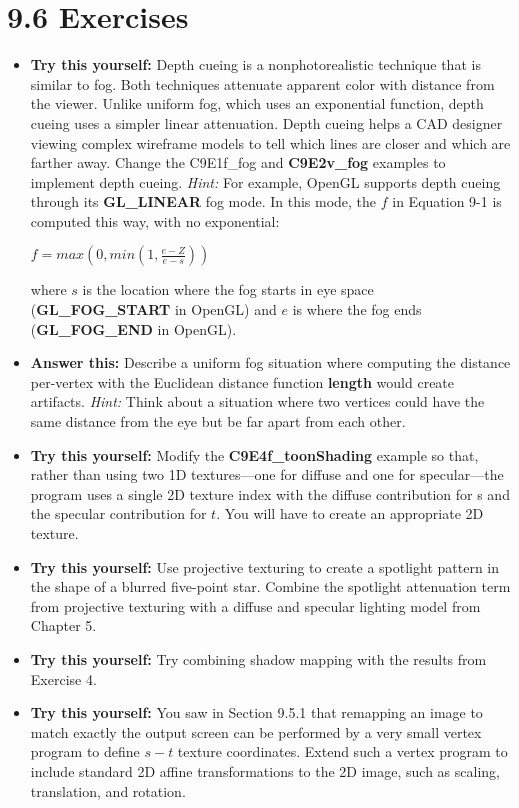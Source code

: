 \documentclass[../main.tex]{subfiles}
\begin{document}
\section{9.6 Exercises}
\begin{itemize}
\item \textbf{Try this yourself:} Depth cueing is a nonphotorealistic technique that is similar to fog. Both techniques attenuate apparent color with distance from the viewer. Unlike uniform fog, which uses an exponential function, depth cueing uses a simpler linear attenuation. Depth cueing helps a CAD designer viewing complex wireframe models to tell which lines are closer and which are farther away. Change the C9E1f_fog\textbf{ }and \textbf{C9E2v_fog} examples to implement depth cueing. \textit{Hint:} For example, OpenGL supports depth cueing through its \textbf{GL_LINEAR} fog mode. In this mode, the $f$ in Equation 9-1 is computed this way, with no exponential:

\FloatBarrier
$
f=max\left( 0,min\left( 1,\frac{e-Z}{e-s}\right) \right)
$
\FloatBarrier

where $s$ is the location where the fog starts in eye space (\textbf{GL_FOG_START} in OpenGL) and $e$ is where the fog ends (\textbf{GL_FOG_END} in OpenGL).

\item \textbf{Answer this:} Describe a uniform fog situation where computing the distance per-vertex with the Euclidean distance function \textbf{length} would create artifacts. \textit{Hint:} Think about a situation where two vertices could have the same distance from the eye but be far apart from each other.

\item \textbf{Try this yourself:} Modify the \textbf{C9E4f_toonShading} example so that, rather than using two 1D textures—one for diffuse and one for specular—the program uses a single 2D texture index with the diffuse contribution for s and the specular contribution for $t$. You will have to create an appropriate 2D texture.

\item \textbf{Try this yourself:} Use projective texturing to create a spotlight pattern in the shape of a blurred five-point star. Combine the spotlight attenuation term from projective texturing with a diffuse and specular lighting model from Chapter 5.

\item \textbf{Try this yourself:} Try combining shadow mapping with the results from Exercise 4.

\item \textbf{Try this yourself:} You saw in Section 9.5.1 that remapping an image to match exactly the output screen can be performed by a very small vertex program to define $s-t$ texture coordinates. Extend such a vertex program to include standard 2D affine transformations to the 2D image, such as scaling, translation, and rotation.
\end{itemize}
\end{document}
